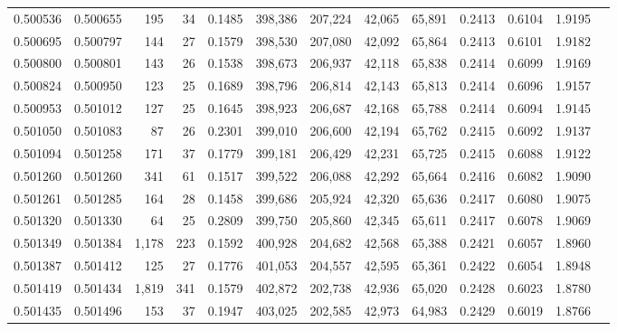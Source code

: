 \begin{tabular}{rrrrrrrrrrrrr}
0.500536 & 0.500655 &   195 &    34 &                                     0.1485 & 398,386 & 207,224 &  42,065 &  65,891 & 0.2413 & 0.6104 & 1.9195 \\
0.500695 & 0.500797 &   144 &    27 &                                     0.1579 & 398,530 & 207,080 &  42,092 &  65,864 & 0.2413 & 0.6101 & 1.9182 \\
0.500800 & 0.500801 &   143 &    26 &                                     0.1538 & 398,673 & 206,937 &  42,118 &  65,838 & 0.2414 & 0.6099 & 1.9169 \\
0.500824 & 0.500950 &   123 &    25 &                                     0.1689 & 398,796 & 206,814 &  42,143 &  65,813 & 0.2414 & 0.6096 & 1.9157 \\
0.500953 & 0.501012 &   127 &    25 &                                     0.1645 & 398,923 & 206,687 &  42,168 &  65,788 & 0.2414 & 0.6094 & 1.9145 \\
0.501050 & 0.501083 &    87 &    26 &                                     0.2301 & 399,010 & 206,600 &  42,194 &  65,762 & 0.2415 & 0.6092 & 1.9137 \\
0.501094 & 0.501258 &   171 &    37 &                                     0.1779 & 399,181 & 206,429 &  42,231 &  65,725 & 0.2415 & 0.6088 & 1.9122 \\
0.501260 & 0.501260 &   341 &    61 &                                     0.1517 & 399,522 & 206,088 &  42,292 &  65,664 & 0.2416 & 0.6082 & 1.9090 \\
0.501261 & 0.501285 &   164 &    28 &                                     0.1458 & 399,686 & 205,924 &  42,320 &  65,636 & 0.2417 & 0.6080 & 1.9075 \\
0.501320 & 0.501330 &    64 &    25 &                                     0.2809 & 399,750 & 205,860 &  42,345 &  65,611 & 0.2417 & 0.6078 & 1.9069 \\
0.501349 & 0.501384 & 1,178 &   223 &                                     0.1592 & 400,928 & 204,682 &  42,568 &  65,388 & 0.2421 & 0.6057 & 1.8960 \\
0.501387 & 0.501412 &   125 &    27 &                                     0.1776 & 401,053 & 204,557 &  42,595 &  65,361 & 0.2422 & 0.6054 & 1.8948 \\
0.501419 & 0.501434 & 1,819 &   341 &                                     0.1579 & 402,872 & 202,738 &  42,936 &  65,020 & 0.2428 & 0.6023 & 1.8780 \\
0.501435 & 0.501496 &   153 &    37 &                                     0.1947 & 403,025 & 202,585 &  42,973 &  64,983 & 0.2429 & 0.6019 & 1.8766 \\

\end{tabular}
